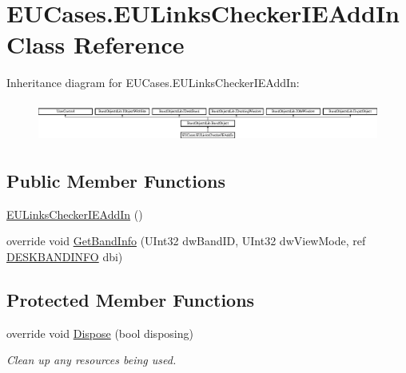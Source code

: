 \hypertarget{class_e_u_cases_1_1_e_u_links_checker_i_e_add_in}{\section{E\+U\+Cases.\+E\+U\+Links\+Checker\+I\+E\+Add\+In Class Reference}
\label{class_e_u_cases_1_1_e_u_links_checker_i_e_add_in}
}
Inheritance diagram for E\+U\+Cases.\+E\+U\+Links\+Checker\+I\+E\+Add\+In\+:\begin{figure}[H]
\begin{center}
\leavevmode
\includegraphics[height=1.320755cm]{class_e_u_cases_1_1_e_u_links_checker_i_e_add_in}
\end{center}
\end{figure}
\subsection*{Public Member Functions}
\begin{DoxyCompactItemize}
\item 
\hyperlink{class_e_u_cases_1_1_e_u_links_checker_i_e_add_in_ad289ed5c1614b0181bc8d5e9aacd33cb}{E\+U\+Links\+Checker\+I\+E\+Add\+In} ()
\item 
override void \hyperlink{class_e_u_cases_1_1_e_u_links_checker_i_e_add_in_a8ca1e4e9af427b91e1006c2da1c89d6d}{Get\+Band\+Info} (U\+Int32 dw\+Band\+I\+D, U\+Int32 dw\+View\+Mode, ref \hyperlink{struct_band_objects_lib_1_1_d_e_s_k_b_a_n_d_i_n_f_o}{D\+E\+S\+K\+B\+A\+N\+D\+I\+N\+F\+O} dbi)
\end{DoxyCompactItemize}
\subsection*{Protected Member Functions}
\begin{DoxyCompactItemize}
\item 
override void \hyperlink{class_e_u_cases_1_1_e_u_links_checker_i_e_add_in_ad490af4f3f899dd8fba7f46dd3e337b7}{Dispose} (bool disposing)
\begin{DoxyCompactList}\small\item\em Clean up any resources being used. \end{DoxyCompactList}\end{DoxyCompactItemize}
